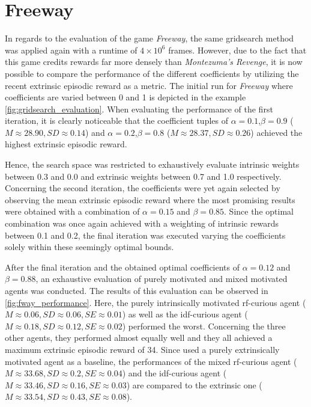 \documentclass[draft,final]{vutinfth} %
\begin{document}
    \section{Freeway}
    In regards to the evaluation of the game \textit{Freeway}, the same gridsearch method was applied again with a runtime of $4\times10^6$ frames.
    However, due to the fact that this game credits rewards far more densely than \textit{Montezuma's Revenge}, it is now possible to compare the performance of the different coefficients by utilizing the recent extrinsic episodic reward as a metric.
    The initial run for \textit{Freeway} where coefficients are varied between 0 and 1 is depicted in the example \autoref{fig:gridsearch_evaluation}.
    When evaluating the performance of the first iteration, it is clearly noticeable that the coefficient tuples of $\alpha=0.1$,$\beta=0.9$ ($M\approx28.90,SD\approx0.14$) and $\alpha=0.2$,$\beta=0.8$ ($M\approx28.37,SD\approx0.26$) achieved the highest extrinsic episodic reward.

    Hence, the search space was restricted to exhaustively evaluate intrinsic weights between 0.3 and 0.0 and extrinsic weights between 0.7 and 1.0 respectively.
    Concerning the second iteration, the coefficients were yet again selected by observing the mean extrinsic episodic reward where the most promising results were obtained with a combination of $\alpha=0.15$ and $\beta=0.85$.
    Since the optimal combination was once again achieved with a weighting of intrinsic rewards between 0.1 and 0.2, the final iteration was executed varying the coefficients solely within these seemingly optimal bounds.

    After the final iteration and the obtained optimal coefficients of $\alpha=0.12$ and $\beta=0.88$, an exhaustive evaluation of purely motivated and mixed motivated agents was conducted.
    The results of this evaluation can be observed in \autoref{fig:fway_performance}.
    Here, the purely intrinsically motivated \gls{rf}-curious agent ($M\approx0.06,SD\approx0.06,SE\approx0.01$) as well as the \gls{idf}-curious agent ($M\approx0.18,SD\approx0.12,SE\approx0.02$) performed the worst.
    Concerning the three other agents, they performed almost equally well and they all achieved a maximum extrinsic episodic reward of 34.
    Since \citet{burda_large-scale_2018-1} used a purely extrinsically motivated agent as a baseline, the performances of the mixed \gls{rf}-curious agent ($M\approx33.68,SD\approx0.2,SE\approx0.04$) and the \gls{idf}-curious agent ($M\approx33.46,SD\approx0.16,SE\approx0.03$) are compared to the extrinsic one ($M\approx33.54,SD\approx0.43,SE\approx0.08$).
\end{document}
